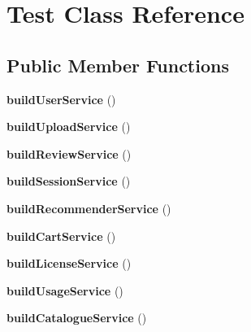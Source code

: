 \hypertarget{class_test}{\section{Test Class Reference}
\label{class_test}
}
\subsection*{Public Member Functions}
\begin{DoxyCompactItemize}
\item 
\hypertarget{class_test_ab66d08cc2cb659b7f90f7eefa761a28c}{{\bfseries build\+User\+Service} ()}\label{class_test_ab66d08cc2cb659b7f90f7eefa761a28c}

\item 
\hypertarget{class_test_a65012036036651e49569f9061deed3f5}{{\bfseries build\+Upload\+Service} ()}\label{class_test_a65012036036651e49569f9061deed3f5}

\item 
\hypertarget{class_test_a07881e9441e41c2d3690ed553635108d}{{\bfseries build\+Review\+Service} ()}\label{class_test_a07881e9441e41c2d3690ed553635108d}

\item 
\hypertarget{class_test_ac9e7d3be00f6d67a5722bff323380606}{{\bfseries build\+Session\+Service} ()}\label{class_test_ac9e7d3be00f6d67a5722bff323380606}

\item 
\hypertarget{class_test_abda7548b5a32f31ce31ef8d416e4265e}{{\bfseries build\+Recommender\+Service} ()}\label{class_test_abda7548b5a32f31ce31ef8d416e4265e}

\item 
\hypertarget{class_test_aaf23cd1c7f3e1930bccb8865f80e16e1}{{\bfseries build\+Cart\+Service} ()}\label{class_test_aaf23cd1c7f3e1930bccb8865f80e16e1}

\item 
\hypertarget{class_test_a361ba504718a831d3e918cb8af75374e}{{\bfseries build\+License\+Service} ()}\label{class_test_a361ba504718a831d3e918cb8af75374e}

\item 
\hypertarget{class_test_a6f0735f9117c4b3c98744f8f2b7b0837}{{\bfseries build\+Usage\+Service} ()}\label{class_test_a6f0735f9117c4b3c98744f8f2b7b0837}

\item 
\hypertarget{class_test_a4e7865e1692bd333312d9579ad0f7e66}{{\bfseries build\+Catalogue\+Service} ()}\label{class_test_a4e7865e1692bd333312d9579ad0f7e66}


\end{DoxyCompactItemize}
